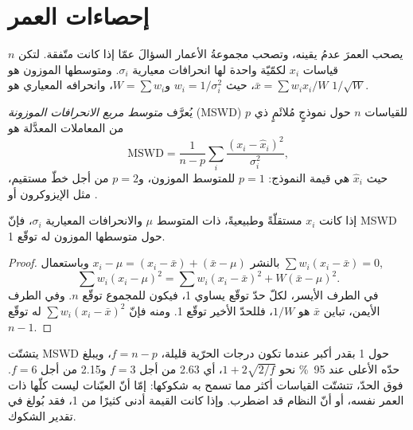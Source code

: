 \section{إحصاءات العمر}\label{sec:b3:advanced-geochronology:statistics}

يصحب العمرَ عدمُ يقينه، وتصحب مجموعةُ الأعمار السؤالَ
عمّا إذا كانت متّفقة. لتكن $n$ قياسات $x_i$ لكمّيّة واحدة لها انحرافات معيارية
$\sigma_i$. ومتوسطها الموزون هو $\bar x = \sum w_ix_i/W$، حيث
$w_i = 1/\sigma_i^2$ و$W = \sum w_i$، وانحرافه المعياري هو
$1/\sqrt W$.

\begin{definition}\label{def:b3:advanced-geochronology:mswd}
يُعرَّف \emph{متوسط مربع الانحرافات الموزونة}
(MSWD) للقياسات $n$ حول نموذجٍ مُلائَمٍ ذي $p$ من المعاملات المعدَّلة
هو
\[
\mathrm{MSWD} = \frac{1}{n - p}\sum_i \frac{(x_i - \hat x_i)^2}{\sigma_i^2},
\]
حيث $\hat x_i$ هي قيمة النموذج: $p = 1$ للمتوسط الموزون، و$p = 2$ من أجل
خطّ مستقيم، مثل الإيزوكرون أو .
\end{definition}

\begin{proposition}\label{prop:b3:advanced-geochronology:mswd}
إذا كانت $x_i$ مستقلّةً وطبيعيةً، ذات المتوسط $\mu$ والانحرافات المعيارية
$\sigma_i$، فإنّ MSWD حول متوسطها الموزون له توقّع 1.
\end{proposition}

\begin{proof}
بالنشر $x_i - \mu = (x_i - \bar x) + (\bar x - \mu)$ وباستعمال $\sum
w_i(x_i - \bar x) = 0$,
\[
\sum w_i(x_i - \mu)^2 = \sum w_i(x_i - \bar x)^2 + W(\bar x - \mu)^2.
\]
في الطرف الأيسر، لكلّ حدّ توقّع يساوي 1، فيكون للمجموع توقّع $n$. وفي
الطرف الأيمن، تباين $\bar x$ هو $1/W$، فللحدّ الأخير توقّع 1.
ومنه فإنّ $\sum w_i(x_i - \bar x)^2$ له توقّع $n - 1$.
\end{proof}

يتشتّت MSWD حول 1 بقدر أكبر عندما تكون درجات الحرّية قليلة،
$f = n - p$، ويبلغ حدّه الأعلى عند \qty{95}{\percent} نحو $1 +
2\sqrt{2/f}$، أي 2.63 من أجل $f = 3$ و2.15 من أجل $f = 6$. فوق الحدّ، تتشتّت
القياسات أكثر مما تسمح به شكوكها: إمّا أنّ العيّنات ليست كلّها ذات العمر نفسه،
أو أنّ النظام قد اضطرب. وإذا كانت القيمة أدنى كثيرًا من 1، فقد بُولغ في
تقدير الشكوك.

